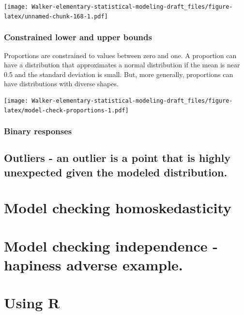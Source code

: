 \documentclass[]{book}
\begin{document}
\texttt{[image: Walker-elementary-statistical-modeling-draft\_files/figure-latex/unnamed-chunk-168-1.pdf]}

\hypertarget{constrained-lower-and-upper-bounds}{%
\subsubsection{Constrained lower and upper bounds}\label{constrained-lower-and-upper-bounds}}

Proportions are constrained to values between zero and one. A proportion can have a distribution that approximates a normal distribution if the mean is near 0.5 and the standard deviation is small. But, more generally, proportions can have distributions with diverse shapes.

\texttt{[image: Walker-elementary-statistical-modeling-draft\_files/figure-latex/model-check-proportions-1.pdf]}

\hypertarget{binary-responses}{%
\subsubsection{Binary responses}\label{binary-responses}}

\hypertarget{outliers---an-outlier-is-a-point-that-is-highly-unexpected-given-the-modeled-distribution.}{%
\subsection{Outliers - an outlier is a point that is highly unexpected given the modeled distribution.}\label{outliers---an-outlier-is-a-point-that-is-highly-unexpected-given-the-modeled-distribution.}}

\hypertarget{model-checking-homoskedasticity}{%
\section{Model checking homoskedasticity}\label{model-checking-homoskedasticity}}

\hypertarget{model-checking-independence---hapiness-adverse-example.}{%
\section{Model checking independence - hapiness adverse example.}\label{model-checking-independence---hapiness-adverse-example.}}

\hypertarget{using-r}{%
\section{Using R}\label{using-r}}
\end{document}
